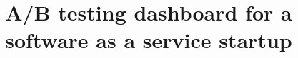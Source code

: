 \documentclass{article}
\title{A/B testing dashboard for a software as a service startup}
\begin{document}
\maketitle
\blindtext

\end{document}
